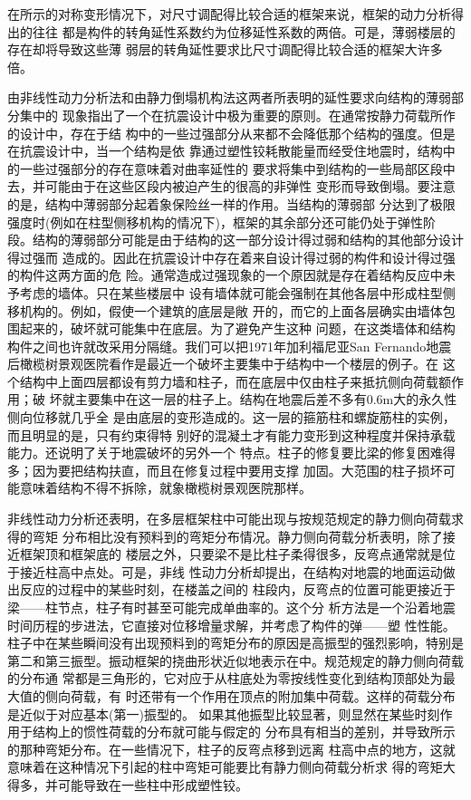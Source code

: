 \documentclass[12pt,a4paper]{book}
\begin{document}
在所示的对称变形情况下，对尺寸调配得比较合适的框架来说，框架的动力分析得出的往往
都是构件的转角延性系数约为位移延性系数的两倍。可是，薄弱楼层的存在却将导致这些薄
弱层的转角延性要求比尺寸调配得比较合适的框架大许多倍。

由非线性动力分析法和由静力倒塌机构法这两者所表明的延性要求向结构的薄弱部分集中的
现象指出了一个在抗震设计中极为重要的原则。在通常按静力荷载所作的设计中，存在于结
构中的一些过强部分从来都不会降低那个结构的强度。但是在抗震设计中，当一个结构是依
靠通过塑性铰耗散能量而经受住地震时，结构中的一些过强部分的存在意味着对曲率延性的
要求将集中到结构的一些局部区段中去，并可能由于在这些区段内被迫产生的很高的非弹性
变形而导致倒塌。要注意的是，结构中薄弱部分起着象保险丝一样的作用。当结构的薄弱部
分达到了极限强度时(例如在柱型侧移机构的情况下)，框架的其余部分还可能仍处于弹性阶
段。结构的薄弱部分可能是由于结构的这一部分设计得过弱和结构的其他部分设计得过强而
造成的。因此在抗震设计中存在着来自设计得过弱的构件和设计得过强的构件这两方面的危
险。通常造成过强现象的一个原因就是存在着结构反应中未予考虑的墙体。只在某些楼层中
设有墙体就可能会强制在其他各层中形成柱型侧移机构的。例如，假使一个建筑的底层是敞
开的，而它的上面各层确实由墙体包围起来的，破坏就可能集中在底层。为了避免产生这种
问题，在这类墙体和结构构件之间也许就改采用分隔缝。我们可以把1971年加利福尼亚San
Fernando地震后橄榄树景观医院看作是最近一个破坏主要集中于结构中一个楼层的例子。在
这个结构中上面四层都设有剪力墙和柱子，而在底层中仅由柱子来抵抗侧向荷载额作用；破
坏就主要集中在这一层的柱子上。结构在地震后差不多有0.6m大的永久性侧向位移就几乎全
是由底层的变形造成的。这一层的箍筋柱和螺旋筋柱的实例，而且明显的是，只有约束得特
别好的混凝土才有能力变形到这种程度并保持承载能力。还说明了关于地震破坏的另外一个
特点。柱子的修复要比梁的修复困难得多；因为要把结构扶直，而且在修复过程中要用支撑
加固。大范围的柱子损坏可能意味着结构不得不拆除，就象橄榄树景观医院那样。

非线性动力分析还表明，在多层框架柱中可能出现与按规范规定的静力侧向荷载求得的弯矩
分布相比没有预料到的弯矩分布情况。静力侧向荷载分析表明，除了接近框架顶和框架底的
楼层之外，只要梁不是比柱子柔得很多，反弯点通常就是位于接近柱高中点处。可是，非线
性动力分析却提出，在结构对地震的地面运动做出反应的过程中的某些时刻，在楼盖之间的
柱段内，反弯点的位置可能更接近于梁——柱节点，柱子有时甚至可能完成单曲率的。这个分
析方法是一个沿着地震时间历程的步进法，它直接对位移增量求解，并考虑了构件的弹——塑
性性能。柱子中在某些瞬间没有出现预料到的弯矩分布的原因是高振型的强烈影响，特别是
第二和第三振型。振动框架的挠曲形状近似地表示在中。规范规定的静力侧向荷载的分布通
常都是三角形的，它对应于从柱底处为零按线性变化到结构顶部处为最大值的侧向荷载，有
时还带有一个作用在顶点的附加集中荷载。这样的荷载分布是近似于对应基本(第一)振型的。
如果其他振型比较显著，则显然在某些时刻作用于结构上的惯性荷载的分布就可能与假定的
分布具有相当的差别，并导致所示的那种弯矩分布。在一些情况下，柱子的反弯点移到远离
柱高中点的地方，这就意味着在这种情况下引起的柱中弯矩可能要比有静力侧向荷载分析求
得的弯矩大得多，并可能导致在一些柱中形成塑性铰。
\end{document}
